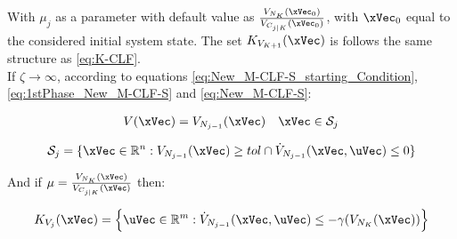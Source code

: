 With \(\mu_{j}\) as a parameter with default value as \( \frac{V_{N_K}(\xVec_0)}{V_{C_{j|K}}(\xVec_0)} \), with \(\xVec_0\) equal to the considered initial system state. The set \(K_{V_{K+1}}(\xVec)\) is follows the same structure as \ref{eq:K-CLF}. \\

If \(\zeta \to \infty\), according to equations \ref{eq:New_M-CLF-S_starting_Condition}, \ref{eq:1stPhase_New_M-CLF-S} and \ref{eq:New_M-CLF-S}:

\begin{align}
    V(\xVec) = V_{N_{j-1}}(\xVec) \quad \xVec \in \mathcal{S}_j
    \label{eq:New_M-CLF-I}
\end{align}

\begin{equation}
    \mathcal{S}_j = \{\xVec \in \mathbb{R}^n: V_{N_{j-1}}(\xVec) \geq tol \cap \dot{V}_{N_{j-1}}(\xVec, \uVec) \leq 0 \}
    \label{eq:New_M-CLF-I_actuationPhaseSet}
\end{equation}



And if \(\mu = \frac{V_{N_K}(\xVec)}{V_{C_{j|K}}(\xVec)}\) then:

\begin{align}
    K_{V_{j}}(\xVec) = \Bigl\{\uVec \in \mathbb{R}^m:  \dot{V}_{N_{j-1}}(\xVec, \uVec) \leq -\gamma( V_{N_{K}}(\xVec)  )\Bigr\}
    \label{eq:M-CLF-I_Constraint}
\end{align}







